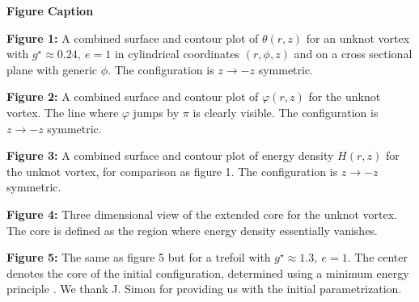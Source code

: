 \vfill\eject
\begin{flushleft}
{\bf Figure Caption}
\end{flushleft}
\vskip 1.0cm

{\bf Figure 1:} A combined surface and contour 
plot of $\theta(r,z)$ for an unknot vortex
with $g^\star \approx 0.24, \ e = 1 $ 
in cylindrical coordinates $(r, \phi, z)$
and on a cross sectional plane with generic $\phi$.
The configuration is $z \to -z$ symmetric.


\vskip 0.4cm
{\bf Figure 2:} A combined surface and contour 
plot of $\varphi(r,z)$ for the unknot 
vortex. The line where $\varphi$ jumps by $\pi$ is clearly visible.
The configuration is $z \to -z$ symmetric.

\vskip 0.4cm
{\bf Figure 3:} A combined surface and contour plot
of energy density $H(r,
z)$ for the unknot vortex, for comparison
as figure 1.
The configuration is $z \to - z$ symmetric. 

\vskip 0.4cm
{\bf Figure 4:} Three dimensional view of the extended
core for the unknot
vortex. The core is defined as the region
where energy density essentially vanishes.

\vskip 0.4cm
{\bf Figure 5:} The same as figure 5 but for a trefoil with
$g^\star \approx 1.3, \ e = 1$. 
The center denotes the core of the initial 
configuration, determined using a minimum energy 
principle \cite{simon}.
We thank J. Simon for providing us with the initial 
parametrization.



 
 




